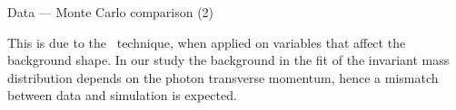 \begin{frame}{Data --- Monte Carlo comparison (2)}

\begin{center}
\end{center}
\begin{alertblock}{}
This is due to the \sPlot\ technique, when applied on variables that affect the
background shape. In our study the background in the fit of the invariant mass
distribution depends on the photon transverse momentum, hence a mismatch
between data and simulation is expected.
\end{alertblock}

\end{frame}

